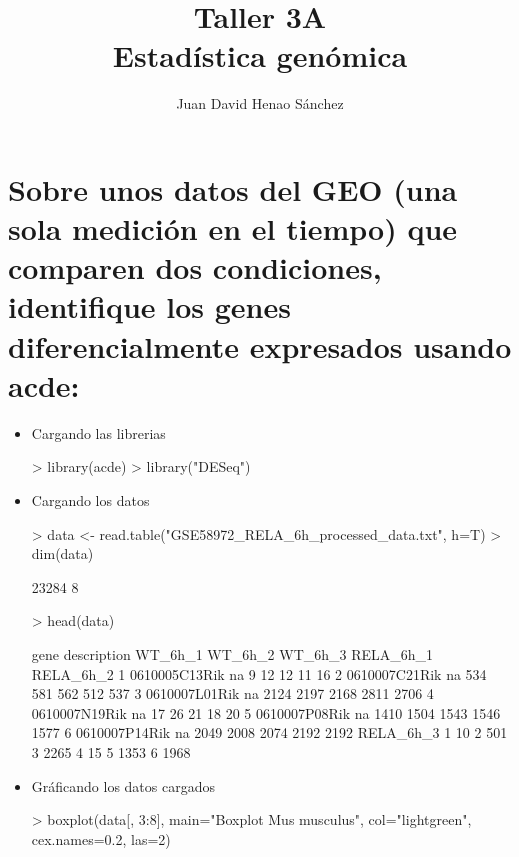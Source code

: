 \documentclass{article}
\title{Taller 3A\\ Estadística genómica}
\author{Juan David Henao Sánchez}
\begin{document}


\maketitle

\section*{Sobre unos datos del GEO (una sola medición en el tiempo) que comparen dos condiciones, identifique los genes diferencialmente expresados usando acde:
}

\begin{itemize}
\item{Cargando las librerias}
\begin{Schunk}
\begin{Sinput}
> library(acde)
> library("DESeq")
\end{Sinput}
\end{Schunk}
\item{Cargando los datos}
\begin{Schunk}
\begin{Sinput}
> data <- read.table("GSE58972_RELA_6h_processed_data.txt", h=T)
> dim(data)
\end{Sinput}
\begin{Soutput}
[1] 23284     8
\end{Soutput}
\begin{Sinput}
> head(data)
\end{Sinput}
\begin{Soutput}
           gene description WT_6h_1 WT_6h_2 WT_6h_3 RELA_6h_1 RELA_6h_2
1 0610005C13Rik          na       9      12      12        11        16
2 0610007C21Rik          na     534     581     562       512       537
3 0610007L01Rik          na    2124    2197    2168      2811      2706
4 0610007N19Rik          na      17      26      21        18        20
5 0610007P08Rik          na    1410    1504    1543      1546      1577
6 0610007P14Rik          na    2049    2008    2074      2192      2192
  RELA_6h_3
1        10
2       501
3      2265
4        15
5      1353
6      1968
\end{Soutput}
\end{Schunk}
\item{Gráficando los datos cargados}
\begin{Schunk}
\begin{Sinput}
> boxplot(data[, 3:8], main="Boxplot Mus musculus", col="lightgreen", cex.names=0.2, las=2)

\end{Sinput}
\end{Schunk}
\end{itemize}
\end{document}
